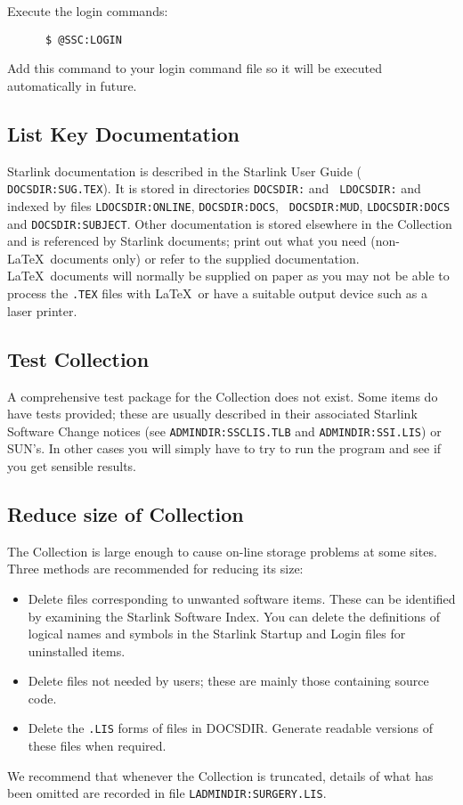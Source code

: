 Execute the login commands:
\begin{verbatim}
      $ @SSC:LOGIN
\end{verbatim}

Add this command to your login command file so it will be executed automatically
in future.

\subsection {List Key Documentation}
\label{ss:listdocs}

Starlink documentation is described in the Starlink User Guide ({\tt
DOCSDIR:SUG.TEX}). It is stored in directories {\tt DOCSDIR:} and {\tt
LDOCSDIR:} and indexed by files {\tt LDOCSDIR:ONLINE}, {\tt DOCSDIR:DOCS}, {\tt
DOCSDIR:MUD}, {\tt LDOCSDIR:DOCS} and {\tt DOCSDIR:SUBJECT}. Other
documentation is stored elsewhere in the Collection and is referenced by
Starlink documents; print out what you need (non-\LaTeX\ documents only) or
refer to the supplied documentation. \LaTeX\ documents will normally be
supplied on paper as you may not be able to process the {\tt .TEX} files with
\LaTeX\ or have a suitable output device such as a laser printer.

\subsection {Test Collection}
\label{ss:testit}

A comprehensive test package for the Collection does not exist.
Some items do have tests provided; these are usually described in their
associated Starlink Software Change notices (see {\tt ADMINDIR:SSCLIS.TLB} and
{\tt ADMINDIR:SSI.LIS}) or SUN's.
In other cases you will simply have to try to run the program and see if you
get sensible results.

\subsection {Reduce size of Collection}
\label{ss:reduce}

The Collection is large enough to cause on-line storage problems at some sites.
Three methods are recommended for reducing its size:

\begin{itemize}

\item Delete files corresponding to unwanted software items. These can be
identified by examining the Starlink Software Index. You can delete the
definitions of logical names and symbols in the Starlink Startup and Login
files for uninstalled items.

\item Delete files not needed by users; these are mainly those containing
source code.

\item Delete the {\tt .LIS} forms of files in DOCSDIR. Generate readable
versions of these files when required.

\end{itemize}
We recommend that whenever the Collection is truncated, details of what has been
omitted are recorded in file {\tt LADMINDIR:SURGERY.LIS}.

